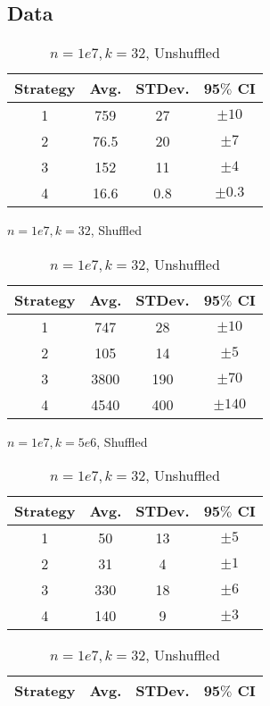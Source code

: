\documentclass[11pt]{article}
\begin{document}
\subsection*{Data}
\vspace{-2mm}
\begin{table}[ht]
    \parbox{.45\linewidth}{
    \centering
    \begin{tabular}{|c c c c|} 
        \hline
        Strategy & Avg. & STDev. & 95$\%$ CI \\ [0.5ex] 
        \hline
        1 & 759 & 27 & $\pm 10$ \\ 
        \hline
        2& 76.5 & 20 & $\pm 7$ \\
        \hline
        3 & 152 & 11 & $\pm 4$ \\
        \hline
        4 & 16.6 & 0.8 & $\pm 0.3$\\
        \hline
       \end{tabular}
    \caption{$n = 1e7, k = 32$, Shuffled}
    \centering
    \begin{tabular}{|c c c c|} 
        \hline
        Strategy & Avg. & STDev. & 95$\%$ CI \\ [0.5ex]
        \hline
        1 & 747& 28 & $\pm 10$ \\ 
        \hline
        2 & 105 & 14 & $\pm 5$ \\
        \hline
        3 & 3800 & 190 & $\pm 70$ \\
        \hline
        4 & 4540 & 400 & $\pm 140$\\
        \hline
       \end{tabular}
    \caption{$n = 1e7, k = 5e6$, Shuffled}
    \centering
    }
    \parbox{.45\linewidth}{
    \centering
    \begin{tabular}{|c c c c|} 
        \hline
        Strategy & Avg. & STDev. & 95$\%$ CI \\ [0.5ex]
        \hline
        1 &50 & 13 & $\pm 5$ \\ 
        \hline
        2 & 31 & 4 & $\pm 1$ \\
        \hline
        3 & 330 & 18 & $\pm 6$ \\
        \hline
        4 & 140 & 9 & $\pm 3$\\
        \hline
       \end{tabular}
    \caption{$n = 1e7, k = 32$, Unshuffled}
    \centering
    \begin{tabular}{|c c c c|} 
        \hline
        Strategy & Avg. & STDev. & 95$\%$ CI \\ [0.5ex]
        \hline

\end{tabular}}
\end{table}
\end{document}
